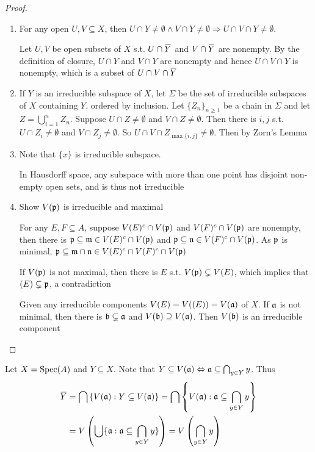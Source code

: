 \documentclass[11pt]{article}
\begin{document}
\begin{proof}
\begin{enumerate}
\item For any open \(U,V\subseteq X\), then \(U\cap Y\neq\emptyset\wedge V\cap Y\neq\emptyset\Rightarrow U\cap V\cap Y\neq\emptyset\).

Let \(U,V\) be open subsets of \(X\) s.t. \(U\cap\barY\) and \(V\cap\barY\) are nonempty. By the
definition of closure, \(U\cap Y\) and \(V\cap Y\) are nonempty and hence \(U\cap V\cap Y\) is nonempty,
which is a subset of \(U\cap V\cap\barY\)

\item If \(Y\) is an irreducible subspace of \(X\), let \(\Sigma\) be the set of irreducible subspaces
of \(X\) containing \(Y\), ordered by inclusion. Let \(\{Z_n\}_{n\ge 1}\) be a chain in \(\Sigma\) and
let \(Z=\bigcup_{i=1}^nZ_n\). Suppose \(U\cap Z\neq\emptyset\) and \(V\cap Z\neq\emptyset\). Then there is \(i,j\)
s.t. \(U\cap Z_i\neq\emptyset\) and \(V\cap Z_j\neq\emptyset\). So \(U\cap V\cap Z_{\max\{i,j\}}\neq\emptyset\). Then by Zorn's Lemma
\item Note that \(\{x\}\) is irreducible subspace.

In Hausdorff space, any subspace with more than one point has disjoint non-empty open sets,
and is thus not irreducible
\item Show \(V(\mathfrak{p})\) is irreducible and maximal

For any \(E,F\subseteq A\), suppose \(V(E)^c\cap V(\mathfrak{p})\) and \(V(F)^c\cap V(\mathfrak{p})\) are nonempty, then there is
\(\mathfrak{p}\subseteq\mathfrak{m}\in V(E)^c\cap V(\mathfrak{p})\) and \(\mathfrak{p}\subseteq\mathfrak{n}\in V(F)^c\cap V(\mathfrak{p})\). As \(\mathfrak{p}\) is
minimal, \(\mathfrak{p}\subseteq\mathfrak{m}\cap\mathfrak{n}\in V(E)^c\cap V(F)^c\cap V(\mathfrak{p})\)

If \(V(\mathfrak{p})\)  is not maximal, then there is \(E\) s.t. \(V(\mathfrak{p})\subsetneq V(E)\), which implies
that \((E)\subsetneq\mathfrak{p}\), a contradiction

Given any irreducible components \(V(E)=V((E))=V(\mathfrak{a})\) of \(X\). If \(\mathfrak{a}\) is not minimal, then
there is \(\mathfrak{b}\subsetneq\mathfrak{a}\) and \(V(\mathfrak{b})\supseteq V(\mathfrak{a})\). Then \(V(\mathfrak{b})\) is an irreducible component
\end{enumerate}
\end{proof}

\begin{remark}
Let \(X=\operatorname{Spec}(A)\) and \(Y\subseteq X\). Note that \(Y\subseteq V(\mathfrak{a})\Leftrightarrow\mathfrak{a}\subseteq\bigcap_{y\in Y}y\). Thus
\begin{align*}
\barY&=\bigcap\left\{ V(\fa):Y\subseteq V(\fa) \right\}=\bigcap\left\{ V(\fa):\fa\subseteq\bigcap_{y\in Y}y \right\}\\&=V\left( \bigcup\{\fa:\fa\subseteq\bigcap_{y\in Y}y\} \right)
=V\left( \bigcap_{y\in Y}y \right)
\end{align*}
\end{remark}
\end{document}
